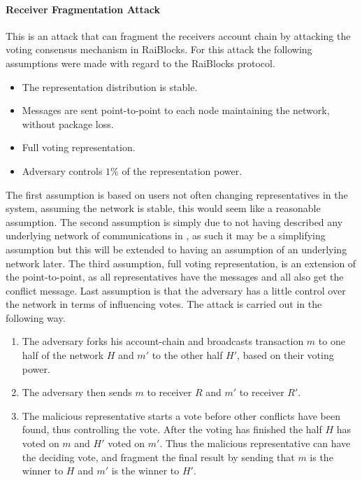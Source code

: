 \paragraph{Receiver Fragmentation Attack}
This is an attack that can fragment the receivers account chain by attacking the voting consensus mechanism in RaiBlocks. For this attack the following assumptions were made with regard to the RaiBlocks protocol. 
\begin{itemize}
    \item The representation distribution is stable.
    \item Messages are sent point-to-point to each node maintaining the network, without package loss.
    \item Full voting representation.
    \item Adversary controls $1\%$ of the representation power. 
\end{itemize}

The first assumption is based on users not often changing representatives in the system, assuming the network is stable, this would seem like a reasonable assumption. The second assumption is simply due to not having described any underlying network of communications in \cite{raiblocks}, as such it may be a simplifying assumption but this will be extended to having an assumption of an underlying network later. The third assumption, full voting representation, is an extension of the point-to-point, as all representatives have the messages and all also get the conflict message. Last assumption is that the adversary has a little control over the network in terms of influencing votes. The attack is carried out in the following way.

\begin{enumerate}
    \item The adversary forks his account-chain and broadcasts transaction $m$ to one half of the network $H$ and $m'$ to the other half $H'$, based on their voting power.
    \item The adversary then sends $m$ to receiver $R$ and $m'$ to receiver $R'$.
    \item The malicious representative starts a vote before other conflicts have been found, thus controlling the vote. After the voting has finished the half $H$ has voted on $m$ and $H'$ voted on $m'$. Thus the malicious representative can have the deciding vote, and fragment the final result by sending that $m$ is the winner to $H$ and $m'$ is the winner to $H'$.
\end{enumerate}


